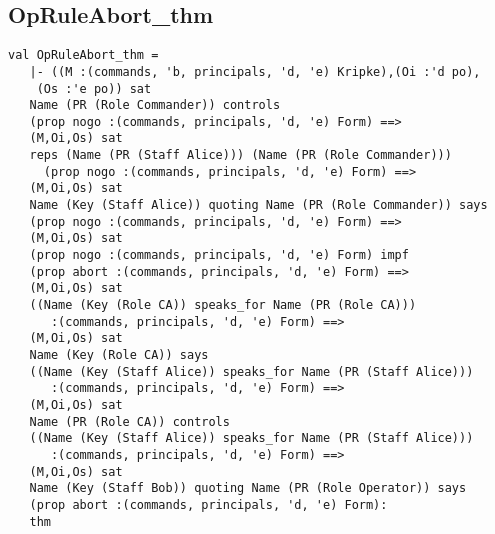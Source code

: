 \documentclass{report}
\begin{document}
\subsection{OpRuleAbort_thm}
\label{op-14-3}
\begin{session}
  \begin{scriptsize}
\begin{verbatim}
val OpRuleAbort_thm =
   |- ((M :(commands, 'b, principals, 'd, 'e) Kripke),(Oi :'d po),
    (Os :'e po)) sat
   Name (PR (Role Commander)) controls
   (prop nogo :(commands, principals, 'd, 'e) Form) ==>
   (M,Oi,Os) sat
   reps (Name (PR (Staff Alice))) (Name (PR (Role Commander)))
     (prop nogo :(commands, principals, 'd, 'e) Form) ==>
   (M,Oi,Os) sat
   Name (Key (Staff Alice)) quoting Name (PR (Role Commander)) says
   (prop nogo :(commands, principals, 'd, 'e) Form) ==>
   (M,Oi,Os) sat
   (prop nogo :(commands, principals, 'd, 'e) Form) impf
   (prop abort :(commands, principals, 'd, 'e) Form) ==>
   (M,Oi,Os) sat
   ((Name (Key (Role CA)) speaks_for Name (PR (Role CA)))
      :(commands, principals, 'd, 'e) Form) ==>
   (M,Oi,Os) sat
   Name (Key (Role CA)) says
   ((Name (Key (Staff Alice)) speaks_for Name (PR (Staff Alice)))
      :(commands, principals, 'd, 'e) Form) ==>
   (M,Oi,Os) sat
   Name (PR (Role CA)) controls
   ((Name (Key (Staff Alice)) speaks_for Name (PR (Staff Alice)))
      :(commands, principals, 'd, 'e) Form) ==>
   (M,Oi,Os) sat
   Name (Key (Staff Bob)) quoting Name (PR (Role Operator)) says
   (prop abort :(commands, principals, 'd, 'e) Form):
   thm

\end{verbatim}
  \end{scriptsize}
\end{session}
\end{document}
